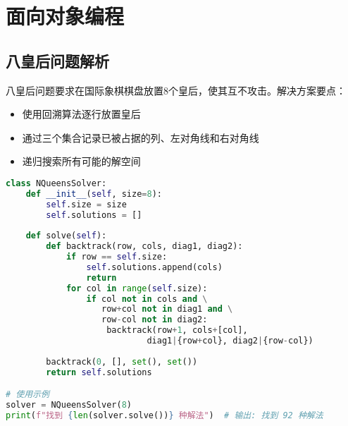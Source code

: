 \documentclass{ctexart}
\begin{document}
\section{面向对象编程}
\subsection{八皇后问题解析}
八皇后问题要求在国际象棋棋盘放置8个皇后，使其互不攻击。解决方案要点：
\begin{itemize}
\item 使用回溯算法逐行放置皇后
\item 通过三个集合记录已被占据的列、左对角线和右对角线
\item 递归搜索所有可能的解空间
\end{itemize}

\begin{lstlisting}[language=Python]
class NQueensSolver:
    def __init__(self, size=8):
        self.size = size
        self.solutions = []
    
    def solve(self):
        def backtrack(row, cols, diag1, diag2):
            if row == self.size:
                self.solutions.append(cols)
                return
            for col in range(self.size):
                if col not in cols and \
                   row+col not in diag1 and \
                   row-col not in diag2:
                    backtrack(row+1, cols+[col], 
                            diag1|{row+col}, diag2|{row-col})
        
        backtrack(0, [], set(), set())
        return self.solutions

# 使用示例
solver = NQueensSolver(8)
print(f"找到 {len(solver.solve())} 种解法")  # 输出: 找到 92 种解法
\end{lstlisting}
\end{document}
